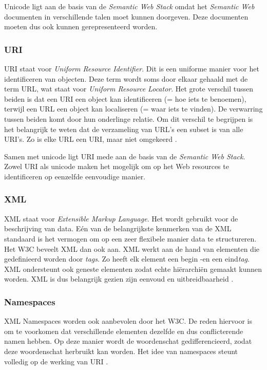Unicode ligt aan de basis van de \textit{Semantic Web Stack} omdat het \textit{Semantic Web} documenten in verschillende talen moet kunnen doorgeven. Deze documenten moeten dus ook kunnen gerepresenteerd worden.

\subsubsection{URI}
URI staat voor \textit{Uniform Resource Identifier}. Dit is een uniforme manier voor het identificeren van objecten. Deze term wordt soms door elkaar gehaald met de term URL, wat staat voor \textit{Uniform Resource Locator}. Het grote verschil tussen beiden is dat een URI een object kan identificeren (= hoe iets te benoemen), terwijl een URL een object kan localiseren (= waar iets te vinden). De verwarring tussen beiden komt door hun onderlinge relatie. Om dit verschil te begrijpen is het belangrijk te weten dat de verzameling van URL's een subset is van alle URI's. Zo is elke URL een URI, maar niet omgekeerd \cite{uri}.

Samen met unicode ligt URI mede aan de basis van de \textit{Semantic Web Stack}. Zowel URI als unicode maken het mogelijk om op het Web resources te identificeren op eenzelfde eenvoudige manier.

\subsubsection{XML}
XML staat voor \textit{Extensible Markup Language}. Het wordt gebruikt voor de beschrijving van data. Eén van de belangrijkste kenmerken van de XML standaard is het vermogen om op een zeer flexibele manier data te structureren. Het W3C beveelt XML dan ook aan. XML werkt aan de hand van elementen die gedefinieerd worden door \textit{tags}. Zo heeft elk element een begin -en een eind\textit{tag}. XML ondersteunt ook geneste elementen zodat echte hiërarchiën gemaakt kunnen worden. XML is dus belangrijk gezien zijn eenvoud en uitbreidbaarheid \cite{bray2000extensible}. 

\subsubsection{Namespaces}
XML Namespaces worden ook aanbevolen door het W3C. De reden hiervoor is om te voorkomen dat verschillende elementen dezelfde en dus conflicterende namen hebben. Op deze manier wordt de woordenschat gedifferencieerd, zodat deze woordenschat herbruikt kan worden. Het idee van namespaces steunt volledig op de werking van URI \cite{bray1999namespaces}.

